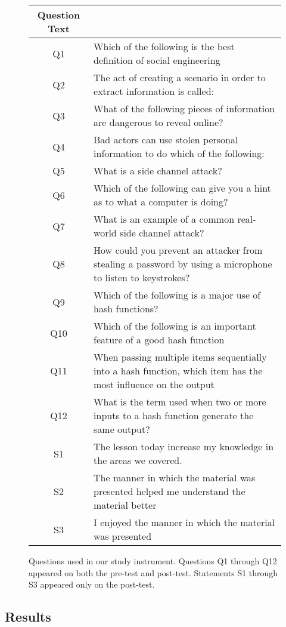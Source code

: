 \begin{figure}[h]
  \scriptsize
  \begin{tabular}{c | p{6cm}}
Question Text  &     \\
\hline
Q1 & Which of the following is the best definition of social engineering \\
Q2  & The act of creating a scenario in order to extract information is called:   \\
Q3 & What of the following pieces of information are dangerous to reveal online?  \\
Q4  & Bad actors can use stolen personal information to do which of the following: \\
Q5 & What is a side channel attack?  \\
Q6  & Which of the following can give you a hint as to what a computer is doing?   \\
Q7 & What is an example of a common real-world side channel attack? \\
Q8  & How could you prevent an attacker from stealing a password by using a microphone to listen to keystrokes?\\
Q9 & Which of the following is a major use of hash functions? \\
Q10 & Which of the following is an important feature of a good hash function  \\
Q11 & When passing multiple items sequentially into a hash function, which item has the most influence on the output \\
Q12 & What is the term used when two or more inputs to a hash function generate the same output? \\
\hline
S1 & The lesson today increase my knowledge in the areas we covered. \\
S2  & The manner in which the material was presented helped me understand the material better\\
S3 & I enjoyed the manner in which the material was presented  \\
\end{tabular}
\caption{Questions used in our study instrument.  Questions Q1 through Q12
    appeared on both the pre-test and post-test.  Statements S1 through S3
    appeared only on the post-test.}
\label{fig:assessment}
\end{figure}


\subsection{Results}

